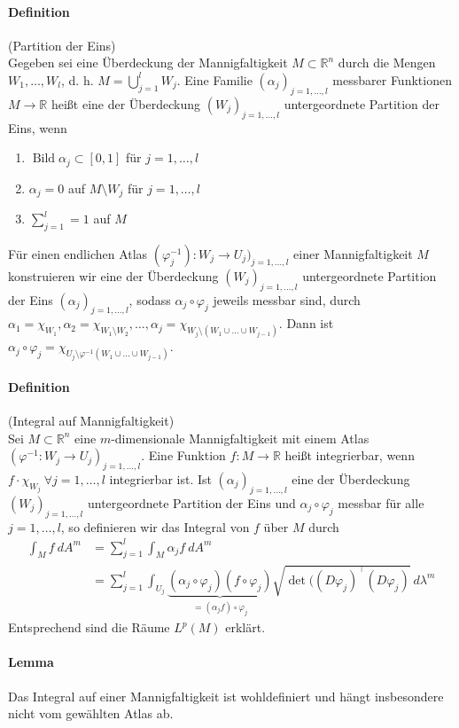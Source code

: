 \documentclass[12pt,a4paper,fleqn]{article}
\def\R{{\mathbb{R}}}
\begin{document}
 \paragraph{Definition} (Partition der Eins)\\
 Gegeben sei eine Überdeckung der Mannigfaltigkeit $M \subset \R^n$ durch die Mengen $W_1, \dots, W_l$, d. h. $M = \bigcup_{j = 1}^l W_j$. Eine Familie $(\alpha_j)_{j = 1, \dots, l}$ messbarer Funktionen $M \rightarrow \R$ heißt eine der Überdeckung $(W_j)_{j = 1, \dots, l}$ untergeordnete Partition der Eins, wenn
 \begin{enumerate}
 \item$\operatorname{Bild}\alpha_j \subset [0, 1]$ für $j = 1, \dots, l$
 \item$\alpha_j = 0$ auf $M\setminus W_j$ für $j = 1, \dots, l$
 \item$\sum_{j = 1}^l = 1$ auf $M$
 \end{enumerate}
 Für einen endlichen Atlas $(\varphi_j^{-1})\colon W_j \rightarrow U_j)_{j = 1, \dots, l}$ einer Mannigfaltigkeit $M$ konstruieren wir eine der Überdeckung $(W_j)_{j = 1, \dots, l}$ untergeordnete Partition der Eins $(\alpha_j)_{j = 1, \dots, l}$, sodass $\alpha_j \circ \varphi_j$ jeweils messbar sind, durch $\alpha_1 = \chi_{W_1}, \alpha_2 = \chi_{W_1\setminus W_2}, \dots, {\alpha_j = \chi_{W_j \setminus (W_1\cup\dots \cup W_{j-1})}}$. Dann ist $\alpha_j \circ \varphi_j = \chi_{U_j\setminus \varphi^{-1}(W_1\cup\dots\cup W_{j-1})}$.
 
 \paragraph{Definition} (Integral auf Mannigfaltigkeit)\\
 Sei $M \subset \R^n$ eine $m$-dimensionale Mannigfaltigkeit mit einem Atlas ${(\varphi^{-1}\colon W_j \rightarrow U_j)_{j = 1, \dots, l}}$. Eine Funktion $f\colon M \rightarrow \R$ heißt integrierbar, wenn $f \cdot \chi_{W_j}\ \forall j = 1, \dots, l$ integrierbar ist. Ist $(\alpha_j)_{j = 1, \dots, l}$ eine der Überdeckung $(W_j)_{j = 1, \dots, l}$ untergeordnete Partition der Eins und $\alpha_j \circ \varphi_j$ messbar für alle $j = 1, \dots, l$, so definieren wir das Integral von $f$ über $M$ durch
 \begin{align*}
 \int_M f\ dA^m &= \sum_{j = 1}^l \int_M \alpha_j f\ dA^m\\
 &= \sum_{j = 1}^l \int_{U_j} \underbrace{(\alpha_j \circ \varphi_j)(f \circ \varphi_j)}_{= (\alpha_j f)\circ \varphi_j}\sqrt{\det((D\varphi_j)^\top(D\varphi_j)}\ d\lambda^m
 \end{align*}
 Entsprechend sind die Räume $L^p(M)$ erklärt.

\paragraph{Lemma} Das Integral auf einer Mannigfaltigkeit ist wohldefiniert und hängt insbesondere nicht vom gewählten Atlas ab.
\end{document}
